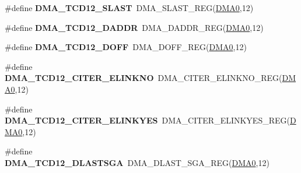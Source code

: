 \begin{DoxyCompactItemize}
\item 
\#define {\bfseries D\+M\+A\+\_\+\+T\+C\+D12\+\_\+\+S\+L\+A\+ST}~D\+M\+A\+\_\+\+S\+L\+A\+S\+T\+\_\+\+R\+EG(\hyperlink{group__DMA__Peripheral__Access__Layer_ga4103044f9ca209772f513dc694513ffb}{D\+M\+A0},12)\hypertarget{group__DMA__Register__Accessor__Macros_ga37b08111761d48e8fcbd24b77c8bbec9}{}\label{group__DMA__Register__Accessor__Macros_ga37b08111761d48e8fcbd24b77c8bbec9}

\item 
\#define {\bfseries D\+M\+A\+\_\+\+T\+C\+D12\+\_\+\+D\+A\+D\+DR}~D\+M\+A\+\_\+\+D\+A\+D\+D\+R\+\_\+\+R\+EG(\hyperlink{group__DMA__Peripheral__Access__Layer_ga4103044f9ca209772f513dc694513ffb}{D\+M\+A0},12)\hypertarget{group__DMA__Register__Accessor__Macros_ga90f1085c61194e55a2a6367d7d03ff29}{}\label{group__DMA__Register__Accessor__Macros_ga90f1085c61194e55a2a6367d7d03ff29}

\item 
\#define {\bfseries D\+M\+A\+\_\+\+T\+C\+D12\+\_\+\+D\+O\+FF}~D\+M\+A\+\_\+\+D\+O\+F\+F\+\_\+\+R\+EG(\hyperlink{group__DMA__Peripheral__Access__Layer_ga4103044f9ca209772f513dc694513ffb}{D\+M\+A0},12)\hypertarget{group__DMA__Register__Accessor__Macros_gad80b977b0e363070cc25f99053dd7a77}{}\label{group__DMA__Register__Accessor__Macros_gad80b977b0e363070cc25f99053dd7a77}

\item 
\#define {\bfseries D\+M\+A\+\_\+\+T\+C\+D12\+\_\+\+C\+I\+T\+E\+R\+\_\+\+E\+L\+I\+N\+K\+NO}~D\+M\+A\+\_\+\+C\+I\+T\+E\+R\+\_\+\+E\+L\+I\+N\+K\+N\+O\+\_\+\+R\+EG(\hyperlink{group__DMA__Peripheral__Access__Layer_ga4103044f9ca209772f513dc694513ffb}{D\+M\+A0},12)\hypertarget{group__DMA__Register__Accessor__Macros_ga4fbff5cf590769e3d1046d61c9374be2}{}\label{group__DMA__Register__Accessor__Macros_ga4fbff5cf590769e3d1046d61c9374be2}

\item 
\#define {\bfseries D\+M\+A\+\_\+\+T\+C\+D12\+\_\+\+C\+I\+T\+E\+R\+\_\+\+E\+L\+I\+N\+K\+Y\+ES}~D\+M\+A\+\_\+\+C\+I\+T\+E\+R\+\_\+\+E\+L\+I\+N\+K\+Y\+E\+S\+\_\+\+R\+EG(\hyperlink{group__DMA__Peripheral__Access__Layer_ga4103044f9ca209772f513dc694513ffb}{D\+M\+A0},12)\hypertarget{group__DMA__Register__Accessor__Macros_ga290c8f3a36c751db0532836878131db6}{}\label{group__DMA__Register__Accessor__Macros_ga290c8f3a36c751db0532836878131db6}

\item 
\#define {\bfseries D\+M\+A\+\_\+\+T\+C\+D12\+\_\+\+D\+L\+A\+S\+T\+S\+GA}~D\+M\+A\+\_\+\+D\+L\+A\+S\+T\+\_\+\+S\+G\+A\+\_\+\+R\+EG(\hyperlink{group__DMA__Peripheral__Access__Layer_ga4103044f9ca209772f513dc694513ffb}{D\+M\+A0},12)\hypertarget{group__DMA__Register__Accessor__Macros_ga1c61d3ecf389551728ac8271b2e53486}{}\label{group__DMA__Register__Accessor__Macros_ga1c61d3ecf389551728ac8271b2e53486}


\end{DoxyCompactItemize}
